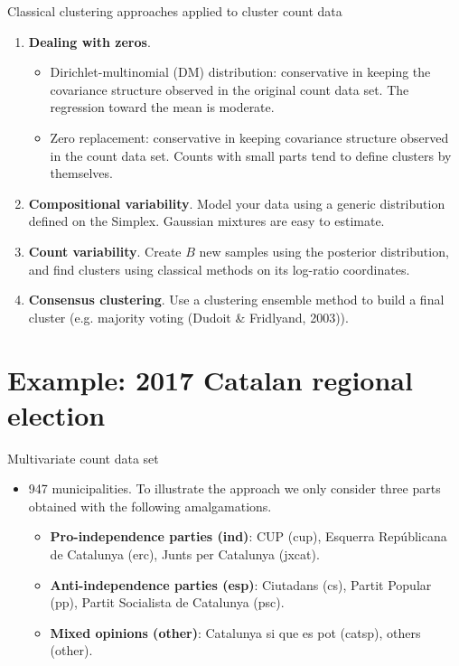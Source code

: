 \documentclass[9pt]{beamer}
\begin{document}
\begin{frame}{Classical clustering approaches applied to cluster count data}

\begin{enumerate}
\item \textbf{Dealing with zeros}. 
\begin{itemize}
\item Dirichlet-multinomial (DM) distribution: conservative in keeping the covariance structure observed in the original count data set. The regression toward the mean is moderate.
\item Zero replacement: conservative in keeping covariance structure observed in the count data set. Counts with small parts tend to define clusters by themselves.
\end{itemize}
\item \textbf{Compositional variability}. Model your data using a generic distribution defined on the Simplex. Gaussian mixtures  are easy to estimate.
\item \textbf{Count variability}. Create $B$ new samples using the posterior distribution, and find clusters using classical methods on its log-ratio coordinates.
\item \textbf{Consensus clustering}. Use a clustering ensemble method to build a final cluster  (e.g. majority voting (Dudoit \& Fridlyand, 2003)).
\end{enumerate}
\end{frame}

\section{Example: 2017 Catalan regional election}

\begin{frame}{Multivariate count data set}

\begin{itemize}
\item 947 municipalities. To illustrate the approach we only consider three parts obtained with the following amalgamations.
\begin{itemize}
\item \textbf{Pro-independence parties (ind)}: CUP (cup), Esquerra Repúblicana de Catalunya (erc), Junts per Catalunya (jxcat).
\item \textbf{Anti-independence parties (esp)}: Ciutadans (cs), Partit Popular (pp), Partit Socialista de Catalunya (psc).
\item \textbf{Mixed opinions (other)}: Catalunya si que es pot (catsp), others (other).
\end{itemize}

\end{itemize}



\end{frame}
\end{document}

